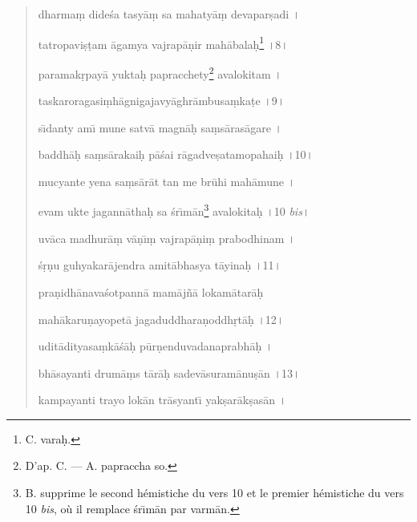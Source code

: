 \documentclass[a4paper, 11pt, oneside, french]{article}
\begin{document}
\begin{quotation}
\bigskip

dharma\d{m} dide\'{s}a tasy\={a}\d{m} sa mahaty\={a}\d{m} devapar\d{s}adi \texthindi{।}

tatropavi\d{s}\d{t}am \={a}gamya vajrap\={a}\d{n}ir mah\={a}bala\d{h}\footnote{C. vara\d{h}.} \texthindi{।}8\texthindi{।}

\bigskip

paramak\d{r}pay\={a} yukta\d{h} papracchety\footnote{D'ap. C. --- A. papraccha so.} avalokitam \texthindi{।}

taskaroragasi\d{m}h\={a}gnigajavy\={a}ghr\={a}mbusa\d{m}ka\d{t}e \texthindi{।}9\texthindi{।}

\bigskip

s\={\i}danty am\={\i} mune satv\={a} magn\={a}\d{h} sa\d{m}s\={a}ras\={a}gare \texthindi{।}

baddh\={a}\d{h} sa\d{m}s\={a}rakai\d{h} p\={a}\'{s}ai r\={a}gadve\d{s}atamopahai\d{h} \texthindi{।}10\texthindi{।}

\bigskip

mucyante yena sa\d{m}s\={a}r\={a}t tan me br\={u}hi mah\={a}mune \texthindi{।}

evam ukte jagann\={a}tha\d{h} sa \'{s}r\={\i}m\={a}n\footnote{B. supprime le second hémistiche du vers 10 et le premier hémistiche du vers 10 \emph{bis}, où il remplace \'{s}r\={\i}m\={a}n par varm\={a}n.} avalokita\d{h} \texthindi{।}10 \emph{bis}\texthindi{।}

\bigskip

uv\={a}ca madhur\={a}\d{m} v\={a}\d{n}\={\i}\d{m} vajrap\={a}\d{n}i\d{m} prabodhinam \texthindi{।}

\'{s}\d{r}\d{n}u guhyakar\={a}jendra amit\={a}bhasya t\={a}yina\d{h} \texthindi{।}11\texthindi{।}

\bigskip

pra\d{n}idh\={a}nava\'{s}otpann\={a} mam\={a}j\~{n}\={a} lokam\={a}tar\={a}\d{h}

mah\={a}karu\d{n}ayopet\={a} jagaduddhara\d{n}oddh\d{r}t\={a}\d{h} \texthindi{।}12\texthindi{।}

\bigskip

udit\={a}dityasa\d{m}k\={a}\'{s}\={a}\d{h} p\={u}r\d{n}enduvadanaprabh\={a}\d{h} \texthindi{।}

bh\={a}sayanti drum\={a}\d{m}s t\={a}r\={a}\d{h} sadev\={a}suram\={a}nu\d{s}\={a}n \texthindi{।}13\texthindi{।}

\bigskip

kampayanti trayo lok\={a}n tr\={a}syant\={\i} yak\d{s}ar\={a}k\d{s}as\={a}n \texthindi{।}


\end{quotation}
\end{document}
